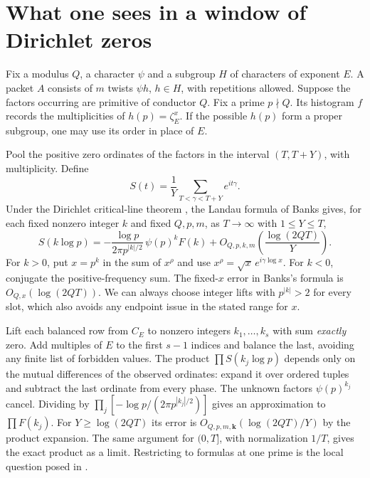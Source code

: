 \documentclass[11pt,letterpaper]{article}
\begin{document}
\newpage
\section{What one sees in a window of Dirichlet zeros}
Fix a modulus $Q$, a character $\psi$ and a subgroup $H$ of characters of exponent $E$. A packet $A$ consists of $m$ twists $\psi h$, $h\in H$, with repetitions allowed. Suppose the factors occurring are primitive of conductor $Q$. Fix a prime $p\nmid Q$. Its histogram $f$ records the multiplicities of $h(p)=\zeta_E^x$. If the possible $h(p)$ form a proper subgroup, one may use its order in place of $E$.

Pool the positive zero ordinates of the factors in the interval $(T,T+Y)$, with multiplicity. Define
\[
 S(t)=\frac1Y\sum_{T<\gamma<T+Y}e^{it\gamma}.
\]
Under the Dirichlet critical-line theorem \cite{Lean}, the Landau formula of Banks \cite[Theorem 1.2]{Banks} gives, for each fixed nonzero integer $k$ and fixed $Q,p,m$, as $T\to\infty$ with $1\le Y\le T$,
\begin{equation}\label{eq:landau}
 S(k\log p)=-\frac{\log p}{2\pi p^{|k|/2}}\,\psi(p)^k F(k)
       +O_{Q,p,k,m}\!\left(\frac{\log(2QT)}{Y}\right).
\end{equation}
For $k>0$, put $x=p^k$ in the sum of $x^\rho$ and use $x^\rho=\sqrt{x}\,e^{i\gamma\log x}$. For $k<0$, conjugate the positive-frequency sum. The fixed-$x$ error in Banks's formula is $O_{Q,x}(\log(2QT))$. We can always choose integer lifts with $p^{|k|}>2$ for every slot, which also avoids any endpoint issue in the stated range for $x$.

Lift each balanced row from $C_E$ to nonzero integers $k_1,\ldots,k_s$ with sum \emph{exactly} zero. Add multiples of $E$ to the first $s-1$ indices and balance the last, avoiding any finite list of forbidden values. The product $\prod S(k_j\log p)$ depends only on the mutual differences of the observed ordinates: expand it over ordered tuples and subtract the last ordinate from every phase. The unknown factors $\psi(p)^{k_j}$ cancel. Dividing by $\prod_j[-\log p/(2\pi p^{|k_j|/2})]$ gives an approximation to $\prod F(k_j)$. For $Y\ge\log(2QT)$ its error is $O_{Q,p,m,\mathbf k}(\log(2QT)/Y)$ by the product expansion. The same argument for $(0,T]$, with normalization $1/T$, gives the exact product as a limit. Restricting to formulas at one prime is the local question posed in \cite{Packet}.
\end{document}
